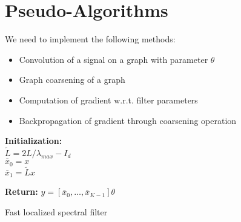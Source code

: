 \section*{Pseudo-Algorithms}

We need to implement the following methods:
\begin{itemize}
    \item Convolution of a signal on a graph with parameter $\theta$
    \item Graph coarsening of a graph
    \item Computation of gradient w.r.t. filter parameters
    \item Backpropagation of gradient through coarsening operation
\end{itemize}


\begin{algorithm}[ht]
 
 \textbf{Initialization:}\\
    $\tilde{L} = 2 L / \lambda_{max} - I_d$ \\
    $\bar{x}_0 = x$ \\
    $\bar{x}_1 = \tilde{L}x$
 
 \textbf{Return:} $y = [\bar{x}_0, \ldots, \bar{x}_{K-1}] \theta$
 \caption{Fast localized spectral filter}
\end{algorithm}